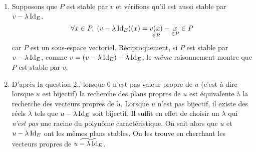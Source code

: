 \begin{enumerate}
\begin{enumerate}
 \item Supposons que $P$ est stable par $v$ et vérifions qu'il est aussi stable par $v-\lambda \operatorname{Id}_E$.
\begin{displaymath}
\forall x\in P,\; (v-\lambda \operatorname{Id}_E)(x) = \underset{\in P}{v(x)} - \underset{\in P}{x}\in P
\end{displaymath}
car $P$ est un sous-espace vectoriel.\newline
Réciproquement, si $P$ est stable par $v-\lambda \operatorname{Id}_E$, comme $v= (v-\lambda \operatorname{Id}_E)+\lambda \operatorname{Id}_E$, le \emph{même} raisonnement montre que $P$ est stable par $v$.
 \item D'après la question 2., lorsque $0$ n'est pas valeur propre de $u$ (c'est à dire lorsque $u$ est bijectif) la recherche des plans propres de $u$ est équivalente à la recherche des vecteurs propres de $\widetilde{u}$.\newline
 Lorsque $u$ n'est pas bijectif,  il existe des réels $\lambda$ tels que $u-\lambda \operatorname{Id}_E$ soit bijectif. Il suffit en effet de choisir un $\lambda$ qui \emph{n'est pas} une racine du polynôme caractéristique. On sait alors que $u$ et $u-\lambda \operatorname{Id}_E$ ont les mêmes plans stables. On les trouve en cherchant les vecteurs propres de $\widetilde{u-\lambda \operatorname{Id}_E}$. 
\end{enumerate}


\end{enumerate}
